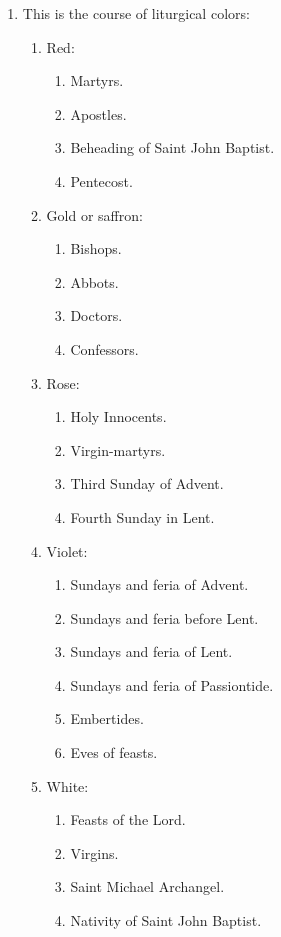 \begin{enumerate}
			\item This is the course of liturgical colors:
			
				\begin{enumerate}
					\item Red: \begin{enumerate}
						\item Martyrs.
						\item Apostles.
						\item Beheading of Saint John Baptist.
						\item Pentecost.
					\end{enumerate}
				
					\item Gold or saffron: \begin{enumerate}
						\item Bishops.
						\item Abbots.
						\item Doctors.
						\item Confessors.
					\end{enumerate}
				
					\item Rose: \begin{enumerate}
						\item Holy Innocents.
						\item Virgin-martyrs.
						\item Third Sunday of Advent.
						\item Fourth Sunday in Lent.
					\end{enumerate}
				
					\item Violet: \begin{enumerate}
						\item Sundays and feria of Advent.
						\item Sundays and feria before Lent.
						\item Sundays and feria of Lent.
						\item Sundays and feria of Passiontide.
						\item Embertides.
						\item Eves of feasts.
					\end{enumerate}
				
					\item White: \begin{enumerate}
						\item Feasts of the Lord.
						\item Virgins.
						\item Saint Michael Archangel.
						\item Nativity of Saint John Baptist.
					\end{enumerate}
				

\end{enumerate}
\end{enumerate}
